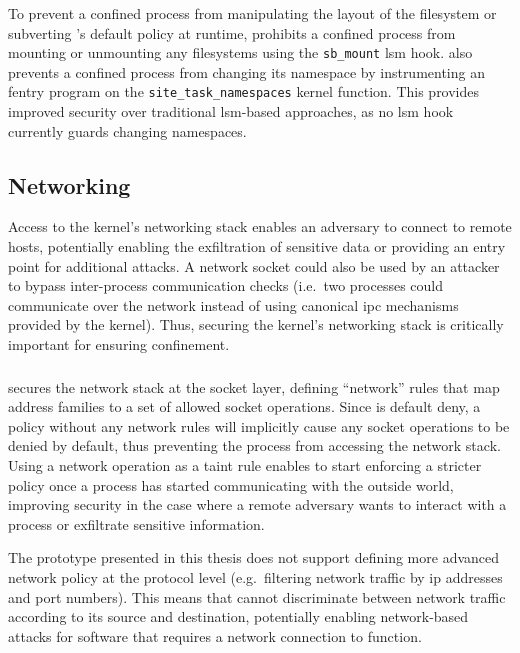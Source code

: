 To prevent a confined process from manipulating the layout of the filesystem or subverting
\bpfcontain{}'s default policy at runtime, \bpfcontain{} prohibits a confined process from
mounting or unmounting any filesystems using the \texttt{sb\_mount} \gls{lsm} hook.
\bpfcontain{} also prevents a confined process from changing its namespace by
instrumenting an fentry program on the \texttt{site\_task\_namespaces} kernel function.
This provides improved security over traditional \gls{lsm}-based approaches, as no
\gls{lsm} hook currently guards changing namespaces.

\subsection{Networking}

Access to the kernel's networking stack enables an adversary to connect to remote hosts,
potentially enabling the exfiltration of sensitive data or providing an entry point for
additional attacks. A network socket could also be used by an attacker to bypass
inter-process communication checks (i.e.\ two processes could communicate over the network
instead of using canonical \gls{ipc} mechanisms provided by the kernel). Thus, securing
the kernel's networking stack is critically important for ensuring confinement.

\subsubsection{\bpfbox{}}

\bpfbox{} secures the network stack at the socket layer, defining \enquote{network} rules
that map address families to a set of allowed socket operations. Since \bpfbox{} is
default deny, a policy without any network rules will implicitly cause any socket
operations to be denied by default, thus preventing the process from accessing the network
stack. Using a network operation as a taint rule enables \bpfbox{} to start enforcing
a stricter policy once a process has started communicating with the outside world,
improving security in the case where a remote adversary wants to interact with a process
or exfiltrate sensitive information.

The \bpfbox{} prototype presented in this thesis does not support defining more advanced
network policy at the protocol level (e.g.\ filtering network traffic by \gls{ip} addresses
and port numbers). This means that \bpfbox{} cannot discriminate between network traffic
according to its source and destination, potentially enabling network-based attacks for
software that requires a network connection to function.

